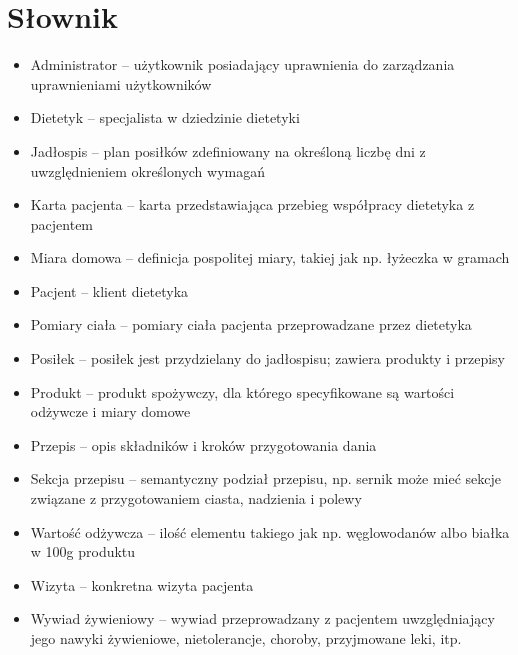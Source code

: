 \section{Słownik}
\begin{itemize}
    \item Administrator – użytkownik posiadający uprawnienia do zarządzania uprawnieniami użytkowników
    \item Dietetyk – specjalista w dziedzinie dietetyki
    \item Jadłospis – plan posiłków zdefiniowany na określoną liczbę dni z uwzględnieniem określonych wymagań
    \item Karta pacjenta – karta przedstawiająca przebieg współpracy dietetyka z pacjentem
    \item Miara domowa – definicja pospolitej miary, takiej jak np. łyżeczka w gramach
    \item Pacjent – klient dietetyka
    \item Pomiary ciała – pomiary ciała pacjenta przeprowadzane przez dietetyka
    \item Posiłek – posiłek jest przydzielany do jadłospisu; zawiera produkty i przepisy
    \item Produkt – produkt spożywczy, dla którego specyfikowane są wartości odżywcze i miary domowe
    \item Przepis – opis składników i kroków przygotowania dania
    \item Sekcja przepisu – semantyczny podział przepisu, np. sernik może mieć sekcje związane z przygotowaniem ciasta, nadzienia i polewy
    \item Wartość odżywcza – ilość elementu takiego jak np. węglowodanów albo białka w 100g produktu
    \item Wizyta – konkretna wizyta pacjenta
    \item Wywiad żywieniowy – wywiad przeprowadzany z pacjentem uwzględniający jego nawyki żywieniowe, nietolerancje, choroby, przyjmowane leki, itp.
\end{itemize}
\thispagestyle{normal}

